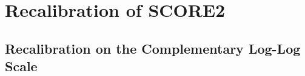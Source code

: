 \chapter{Recalibration of SCORE2}
\label{app:score2-recal}

\section{Recalibration on the Complementary Log-Log Scale}
\label{sec:method-recalibration}

